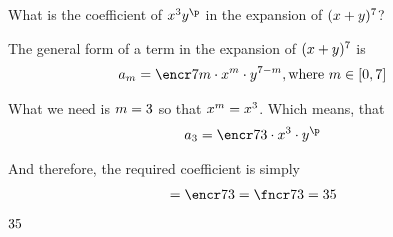 



\SUBTRACT\va\vb\p

\question[3] What is the coefficient of $x^{\vb} y^{\p}$ in the expansion of $(x + y)^{7}$?

\watchout

\begin{solution}[\halfpage]
  The general form of a term in the expansion of $(x+y)^{7}$ is 
  \begin{align}
    a_m &= \encr\va{m}\cdot x^{m}\cdot y^{\va - m}, \text{where } m \in [0,\va]
  \end{align}

  What we need is $m=3$ so that $x^m = x^{3}$. Which means, that 
  \begin{align}
    a_{\vb} &= \encr\va\vb\cdot x^{\vb}\cdot y^{\p}
  \end{align}

  And therefore, the required coefficient is simply
  \begin{align}
     = \encr\va\vb  &= \fncr\va\vb = \vc
  \end{align}
\end{solution}

\ifprintanswers
  \begin{codex}
    $35$
  \end{codex}
\fi 
